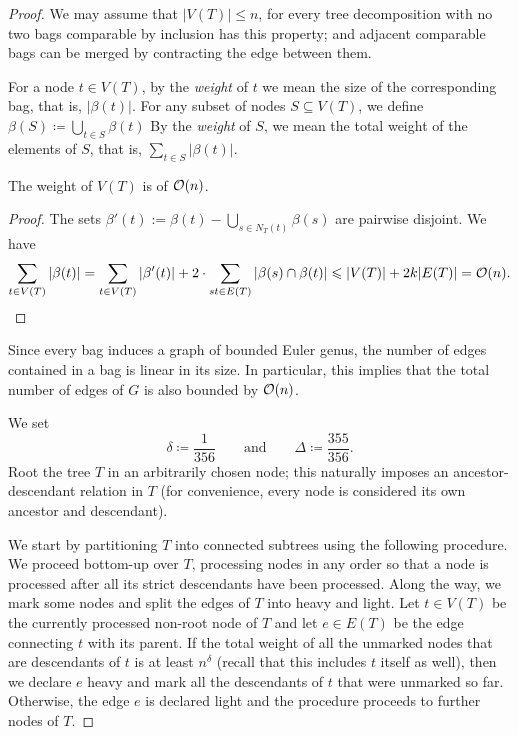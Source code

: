 \begin{proof}
We may assume that $|V(T)|\leq n$, for every tree decomposition with no two bags comparable by inclusion has this property; and adjacent comparable bags can be merged by contracting the edge between them.

For a node $t\in V(T)$, by the {\em{weight}} of $t$ we mean the size of the corresponding bag, that is, $|\beta(t)|$. For any subset of nodes $S \subseteq V(T)$, we define $\beta(S) \coloneqq \bigcup_{t \in S} \beta(t)$ By the {\em{weight}} of $S$, we mean the total weight of the elements of $S$, that is, $\sum_{t\in S} |\beta(t)|$. 

\begin{claim}\label{cl:weight-T}
The weight of $V(T)$ is of $\mathcal{O}(n)$.
\end{claim}

\begin{proof}
The sets $\beta'(t) := \beta(t) - \bigcup_{s \in N_T(t)} \beta(s)$ are pairwise disjoint. We have
$$
\sum_{t \in V(T)} |\beta(t)| =
\sum_{t \in V(T)} |\beta'(t)| + 2 \cdot \sum_{st \in E(T)} |\beta(s) \cap \beta(t)| \leqslant
|V(T)| + 2k|E(T)| = \mathcal{O}(n).
$$
\end{proof}

Since every bag induces a graph of bounded Euler genus, the number of edges contained in a bag is linear in its size. In particular, this implies that the total number of edges of $G$ is also bounded by $\mathcal{O}(n)$.

We set $$\delta \coloneqq \frac{1}{356}\qquad\textrm{and}\qquad \Delta \coloneqq \frac{355}{356}.$$ Root the tree $T$ in an arbitrarily chosen node; this naturally imposes an ancestor-descendant relation in $T$ (for convenience, every node is considered its own ancestor and descendant).

We start by partitioning $T$ into connected subtrees using the following procedure.
We proceed bottom-up over $T$, processing nodes in any order so that a node is processed after all its strict descendants have been processed. Along the way, we mark some nodes and split the edges of $T$ into heavy and light. Let $t \in V(T)$ be the currently processed non-root node of $T$ and let $e \in E(T)$ be the edge connecting $t$ with its parent. If the total weight of all the unmarked nodes that are descendants of $t$ is at least $n^\delta$ (recall that this includes $t$ itself as well), then we declare $e$ heavy and mark all the descendants of $t$ that were unmarked so far. Otherwise, the edge $e$ is declared light and the procedure proceeds to further nodes of $T$.


\end{proof}
